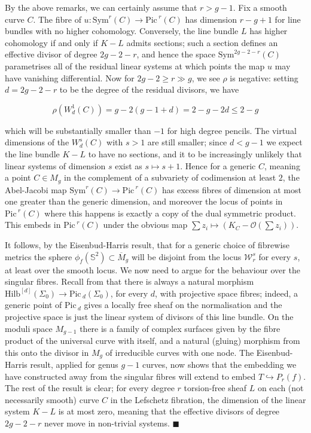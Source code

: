 \documentclass[10pt]{article}
\newcommand{\sss}{\mathbb{S}}
\newcommand{\Sym}{\mathrm{Sym}}
\newcommand{\Pic}{\mathrm{Pic \,}}
\newcommand{\mgbar}{\overline{M}_g}
\newcommand{\Hilb}{\mathrm{Hilb}}
\newenvironment{Pf}{\par \noindent{\sc Proof:} }{\quad $\blacksquare$ \par
\vspace{0.5cm}}
\begin{document}
\begin{Pf}
By the above remarks, we can certainly assume that $r>g-1$. Fix a
smooth curve $C$.
The fibre of $u:\Sym^r (C) \rightarrow \Pic^r (C)$ has dimension $r-g+1$
for line bundles with no higher cohomology.  Conversely, the line
bundle $L$ has higher cohomology if and only if $K-L$ admits sections;
such a section defines an effective divisor of degree $2g-2-r$, and
hence the space $\Sym^{2g-2-r}(C)$ parametrises all of the residual
linear systems at which points the map $u$ may have vanishing differential.
Now for $2g-2 \geq r \gg g$, we see $\rho$ is
negative: setting $d=2g-2-r$ to be the degree of the
residual divisors, we have 

$$\rho(W^1_d(C)) = g-2(g-1+d) = 2-g-2d \leq 2-g$$

\noindent which will be substantially smaller than $-1$ for high
degree pencils.  The virtual dimensions of the $W^s_d(C)$ with $s>1$
are still smaller; since $d < g-1$ we expect the line bundle $K-L$ to
have no sections, and it to be increasingly unlikely that linear
systems of dimension $s$ exist as $s \mapsto s+1$.  Hence for a
generic $C$, meaning a point $C \in M_g$ in the complement of a
subvariety of codimension at least $2$, the Abel-Jacobi map
$\Sym^r(C) \rightarrow \Pic^r (C)$ has excess fibres of dimension at
most one greater than the generic dimension, and moreover the
locus of points in $\Pic^r(C)$ where this happens is exactly a copy of
the dual symmetric product.  This embeds in $\Pic^r(C)$ under the
obvious map $\sum z_i \mapsto (K_C-\mathcal{O}(\sum
z_i))$.

\vspace{0.2cm}

\noindent It follows, by the
Eisenbud-Harris result, that for a generic choice of fibrewise
metrics the sphere $\phi_f (\sss^2) \subset \mgbar$ will be disjoint
from the locus $\mathcal{W}^s_r$ for every $s$, at least over the
smooth locus.  We now need to argue for the behaviour over the
singular fibres.  Recall from \cite{Altman-Kleiman} that there is always
a natural morphism $\Hilb^{[d]}(\Sigma_0) \rightarrow \Pic_d
(\Sigma_0)$, for every $d$, with projective space fibres;  indeed, a
generic point of $\Pic_d$ gives a locally free sheaf on the
normalisation and the projective space is
just the linear system of divisors of this line bundle.  On the moduli
space $M_{g-1}$ there is a family of complex surfaces given by the
fibre product of the universal curve with itself, and a natural
(gluing) morphism from this onto the divisor in $M_g$ of irreducible
curves with one node.  The Eisenbud-Harris result, applied for genus
$g-1$ curves, now shows that the embedding we have constructed away
from the singular fibres will extend to embed $T \hookrightarrow
P_r(f)$.  The rest of the result is clear; for every
degree $r$ torsion-free sheaf $L$ on each (not necessarily smooth) curve $C$
in the Lefschetz 
fibration, the dimension of the linear system $K-L$ is at most zero,
meaning that the effective divisors of degree $2g-2-r$ never move in
non-trivial systems. 
\end{Pf}
\end{document}
